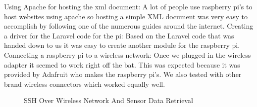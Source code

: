 \documentclass{report}
\begin{document}
\newline
Using Apache for hosting the xml document:
\newline
\indent
A lot of people use raspberry pi's to host websites using apache so hosting a simple XML document was very easy to accomplish by following one of the numerous guides around the internet.
\newline
Creating a driver for the Laravel code for the pi:
\newline
\indent
Based on the Laravel code that was handed down to us it was easy to create another module for the raspberry pi.
\newline
Connecting a raspberry pi to a wireless network:
\newline
\indent
Once we plugged in the wireless adapter it seemed to work right off the bat.
This was expected because it was provided by Adafruit who makes the raspberry pi's.
We also tested with other brand wireless connectors which worked equally well.
\begin{figure}[H]
\caption{SSH Over Wireless Network And Sensor Data Retrieval}
\end{figure}
\end{document}

